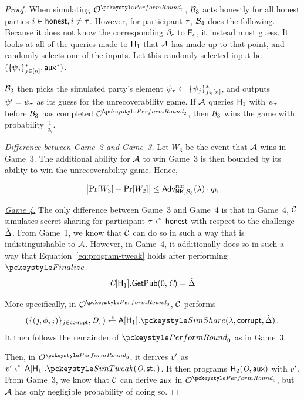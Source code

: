 \begin{proof}
When simulating $\oracle^{\dkgkeygen_3}$,
$\mathcal{B}_3$ acts honestly for all honest parties $i \in \mathsf{honest}, i \neq \tau$.
However, for participant $\tau$, $\mathcal{B}_4$ does the following.
Because it does not know the corresponding $\beta_c$ to $\mathsf{E}_c$,
it instead must guess.
It looks at all of the queries made to $\mathsf{H}_1$ that $\mathcal{A}$ has made up to that point,
and randomly selects one of the inputs.
Let this randomly selected input be $(\{\psi_j \}_{j \in [n]}^*, \mathsf{aux}^*)$.

$\mathcal{B}_3$ then picks the simulated party's element $\psi_\tau \gets \{\psi_j \}_{j \in [n]}^*$,
and outputs $\psi' = \psi_\tau$ as its guess for the \ENIKE unrecoverability game.
%
If $\mathcal{A}$ queries $\mathsf{H}_1$ with $\psi_\tau$ before $\mathcal{B}_3$ has completed $\oracle^{\dkgkeygen_2}$,
then $\mathcal{B}_3$ wins the \ENIKE game with probability $\frac{1}{q_h}$.

\medskip

\noindent \textit{Difference between Game~2 and Game~3.}
Let $W_3$ be the event that $\mathcal{A}$ wins in Game~3.
The additional ability for $\mathcal{A}$ to win Game~3 is then bounded by its ability to win the \ENIKE unrecoverability game.
Hence,

\begin{equation} \label{eq:game3-secrecy}
  \bigl| \Pr[W_3] - \Pr[W_2]  \bigr| \leq
\textsf{\upshape Adv}^{\textrm{\upshape rec}}_{\mathsf{NK},\mathcal{B}_3}(\lambda) \cdot q_h
\end{equation}

\medskip

\noindent \textit{\underline{Game 4.}}
The only difference between Game~3 and Game~4 is that in Game~4,
$\mathcal{C}$ simulates secret sharing for participant $\simid \rgets \honest$ with respect to the challenge $\hat{\Delta}$.
From Game~1,
we know that $\mathcal{C}$ can do so in such a way that is indistinguishable to $\mathcal{A}$.
However, in Game~4,
it additionally does so in such a way that Equation~\ref{eq:program-tweak} holds after performing $\finalize$.
\begin{equation} \label{eq:program-tweak}
  \textit{C}[\mathsf{H}_1].\mathsf{GetPub}(0, \textit{C}) = \hat{\Delta}
\end{equation}


More specifically,
in $\oracle^{\dkgkeygen_0}$,
$\mathcal{C}$ performs
\[ (\{ (j, \share_{\simid j}) \}_{j \in \corrupt}, \vsscommit_\simid) \rgets \avss[\Hash_1].\simshare(\lambda, \corrupt, \dkgchal)\,. \]
It then follows the remainder of $\dkgkeygen_0$ as in Game~3.

Then,
in $\oracle^{\dkgkeygen_3}$,
it derives $v'$ as
$\tweak' \rgets \avss[\Hash_1].\simgettweak(\pubaggregateset, \party_\simid)$.
It then programs $\mathsf{H}_2(\textit{O}, \mathsf{aux})$ with $v'$.
From Game~3, we know that $\mathcal{C}$ can derive $\mathsf{aux}$ in $\oracle^{\dkgkeygen_3}$,
but $\mathcal{A}$ has only negligible probability of doing so.



\end{proof}
